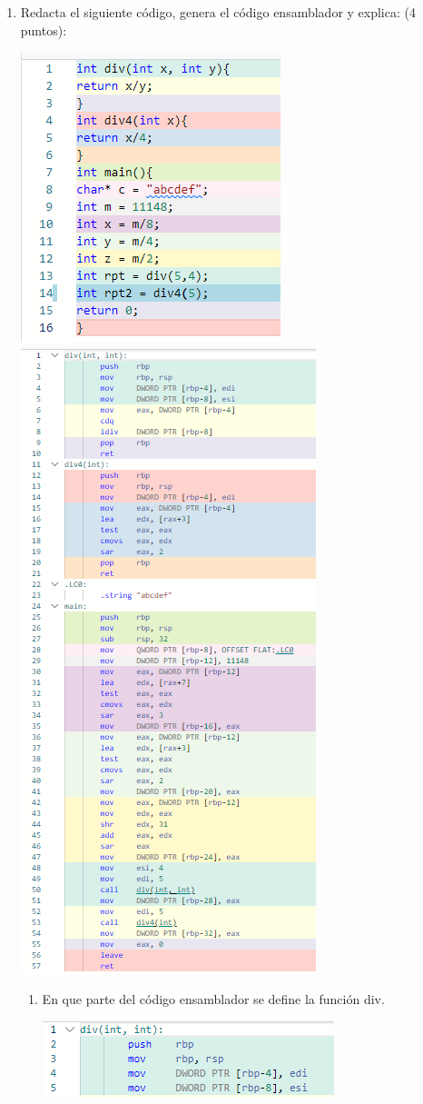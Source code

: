 \documentclass{article}
\begin{document}
\begin{enumerate}
        \item Redacta el siguiente código, genera el código ensamblador y explica: (4 puntos):
            \begin{center}
                \includegraphics[width=.3\textwidth]{Imagenes/ejercicio 6.png}
                \includegraphics[width=.5\textwidth]{Imagenes/ejercicio 6.1.png}
            \end{center}\newpage
        \begin{enumerate}
            \item En que parte del código ensamblador se define la función div.
            \begin{center}
		              \includegraphics[width=.7\textwidth]{Imagenes/ejercicio 6 a.png}

\end{center}
\end{enumerate}
\end{enumerate}
\end{document}
